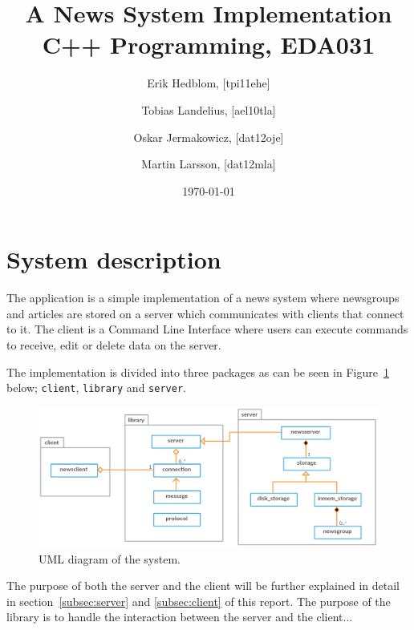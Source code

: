 \documentclass[a4paper]{article}
\title{A News System Implementation \\ C++ Programming, EDA031}
\author{Erik Hedblom, [tpi11ehe]
\and Tobias Landelius, [ael10tla]
\and Oskar Jermakowicz, [dat12oje]
\and Martin Larsson, [dat12mla]}
\date{\today}
\begin{document}
\maketitle

\newpage
\renewcommand{\contentsname}{Table of contents}
\tableofcontents
\newpage

\section{System description}
The application is a simple implementation of a news system where newsgroups and articles are stored on a server which communicates with clients that connect to it. The client is a Command Line Interface where users can execute commands to receive, edit or delete data on the server.

The implementation is divided into three packages as can be seen in Figure~\ref{fig:uml} below; \texttt{client}, \texttt{library} and \texttt{server}.

\begin{figure}[h]
    \centering
    \includegraphics[width=1.0\textwidth]{uml_diagram.png}
    \caption{UML diagram of the system.}
    \label{fig:uml}
\end{figure}

The purpose of both the server and the client will be further explained in detail in section~\ref{subsec:server} and \ref{subsec:client} of this report. The purpose of the library is to handle the interaction between the server and the client...
\end{document}
